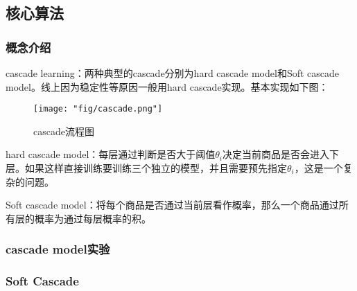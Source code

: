 \subsection{核心算法}
\subsubsection{概念介绍}
cascade learning：两种典型的cascade分别为hard cascade model和Soft cascade model。线上因为稳定性等原因一般用hard cascade实现。基本实现如下图：

\begin{figure}[h]
	\centering
	\texttt{[image: "fig/cascade.png"]}
	\caption{cascade流程图}
	\label{fig:cascade}
\end{figure}

hard cascade model：每层通过判断是否大于阈值$\theta_i$决定当前商品是否会进入下层。如果这样直接训练要训练三个独立的模型，并且需要预先指定$\theta_i$，这是一个复杂的问题。

Soft cascade model：将每个商品是否通过当前层看作概率，那么一个商品通过所有层的概率为通过每层概率的积。



\subsubsection{cascade model实验}

\subsubsection{Soft Cascade}

